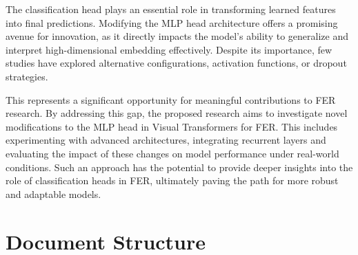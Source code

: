 The classification head plays an essential role in transforming learned features into final predictions. Modifying the MLP head architecture offers a promising avenue for innovation, as it directly impacts the model’s ability to generalize and interpret high-dimensional embedding effectively. Despite its importance, few studies have explored alternative configurations, activation functions, or dropout strategies.

This represents a significant opportunity for meaningful contributions to FER research. By addressing this gap, the proposed research aims to investigate novel modifications to the MLP head in Visual Transformers for FER. This includes experimenting with advanced architectures, integrating recurrent layers and evaluating the impact of these changes on model performance under real-world conditions. Such an approach has
the potential to provide deeper insights into the role of classification heads in FER, ultimately paving the path for more robust and adaptable models.

\section{Document Structure}
%
%
%
%
%
%


